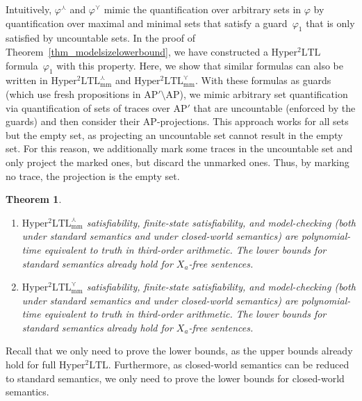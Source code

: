 \documentclass[dvipsnames,10pt,a4paper]{amsart}
\newtheorem{thm}{Theorem}[section]
\theoremstyle{definition}
\theoremstyle{remark}
\renewcommand{\phi}{\varphi}
\newcommand{\sohyltl}{\mathrm{Hyper^2LTL}\xspace}
\newcommand{\sohyltlfpmax}{\mathrm{Hyper^2LTL_{\mathrm{mm}}^{\largest}}\xspace}
\newcommand{\sohyltlfpmin}{\mathrm{Hyper^2LTL_{\mathrm{mm}}^{\smallest}}\xspace}
\newcommand{\ap}[0]{\mathrm{AP}}
\newcommand{\univar}{X_a}
\newcommand{\smallest}{\curlyvee}
\newcommand{\largest}{\curlywedge}
\begin{document}
Intuitively, $\phi^\largest$ and $\phi^\smallest$ mimic the quantification over arbitrary sets in $\phi$ by quantification over maximal and minimal sets that satisfy a guard~$\phi_1$ that is only satisfied by uncountable sets.
In the proof of Theorem~\ref{thm_modelsizelowerbound}, we have constructed 
a $\sohyltl$ formula~$\phi_1$ with this property. 
Here, we show that similar formulas can also be written in $\sohyltlfpmax$ and $\sohyltlfpmin$.
With these formulas as guards (which use fresh propositions in $\ap' \setminus \ap$), we mimic arbitrary set quantification via quantification of sets of traces over $\ap'$ that are uncountable (enforced by the guards) and then consider their $\ap$-projections.
This approach works for all sets but the empty set, as projecting an uncountable set cannot result in the empty set. 
For this reason, we additionally mark some traces in the uncountable set and only project the marked ones, but discard the unmarked ones.
Thus, by marking no trace, the projection is the empty set.

\begin{thm}
\label{thm_hyltlmm_complexity}
\hfill
\begin{enumerate}
    \item $\sohyltlfpmax$ satisfiability, finite-state satisfiability, and model-checking (both under standard semantics and under closed-world semantics) are polynomial-time equivalent to truth in third-order arithmetic. The lower bounds for standard semantics already hold for $\univar$-free sentences.

    \item $\sohyltlfpmin$ satisfiability, finite-state satisfiability, and model-checking (both under standard semantics and under closed-world semantics) are polynomial-time equivalent to truth in third-order arithmetic. The lower bounds for standard semantics already hold for $\univar$-free sentences.

\end{enumerate}
\end{thm}

Recall that we only need to prove the lower bounds, as the upper bounds already hold for full $\sohyltl$.
Furthermore, as closed-world semantics can be reduced to standard semantics, we only need to prove the lower bounds for closed-world semantics.
\end{document}
